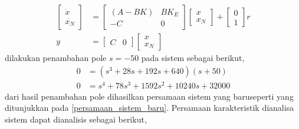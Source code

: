 \documentclass[../main.tex]{subfiles}
\begin{document}
            \begin{equation}
                \begin{split}
                    \begin{bmatrix} \dot{x} \\ \dot{x_N} \end{bmatrix} &= \begin{bmatrix} (A-BK) & BK_E \\ -C & 0 \end{bmatrix} \begin{bmatrix} x \\ x_N \end{bmatrix} + \begin{bmatrix} 0 \\ 1 \end{bmatrix} r \\
                    y &= \begin{bmatrix} C & 0 \end{bmatrix} \begin{bmatrix} x \\ x_N \end{bmatrix}
                \end{split}
            \end{equation}
            dilakukan penambahan pole $s = -50$ pada sistem sebagai berikut,
            \begin{equation}
                \begin{split}
                    0 &= (s^3 + 28s + 192s + 640)(s + 50) \\[5pt]
                    0 &= s^4 + 78s^3 + 1592s^2 + 10240s + 32000
                    \label{persamaan_sistem_baru}
                \end{split}
            \end{equation}
            dari hasil penambahan pole dihasilkan persamaan sistem yang baruseperti yang ditunjukkan pada \eqref{persamaan_sistem_baru}. Persamaan karakteristik dianalisa sistem dapat dianalisis sebagai berikut,
\end{document}
